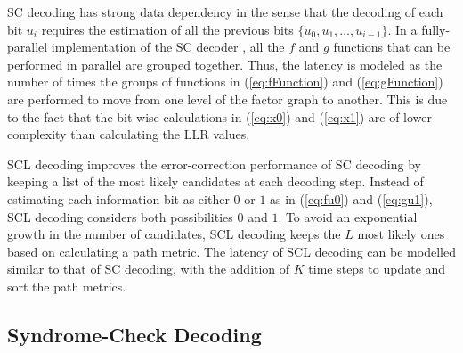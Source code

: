 \documentclass[conference]{IEEEtran}
\begin{document}
SC decoding has strong data dependency in the sense that the decoding of each bit $u_i$ requires the estimation of all the previous bits $\{u_0,u_1,\ldots,u_{i-1}\}$. In a fully-parallel implementation of the SC decoder \cite{arikan2009}, all the $f$ and $g$ functions that can be performed in parallel are grouped together. Thus, the latency is modeled as the number of times the groups of functions in (\ref{eq:fFunction}) and (\ref{eq:gFunction}) are performed to move from one level of the factor graph to another. This is due to the fact that the bit-wise calculations in (\ref{eq:x0}) and (\ref{eq:x1}) are of lower complexity than calculating the LLR values.

SCL decoding \cite{tal2015list} improves the error-correction performance of SC decoding by keeping a list of the most likely candidates at each decoding step. Instead of estimating each information bit as either $0$ or $1$ as in (\ref{eq:fu0}) and (\ref{eq:gu1}), SCL decoding considers both possibilities $0$ and $1$. To avoid an exponential growth in the number of candidates, SCL decoding keeps the $L$ most likely ones based on calculating a path metric. The latency of SCL decoding can be modelled similar to that of SC decoding, with the addition of $K$ time steps to update and sort the path metrics.

\subsection{Syndrome-Check Decoding}
\end{document}
